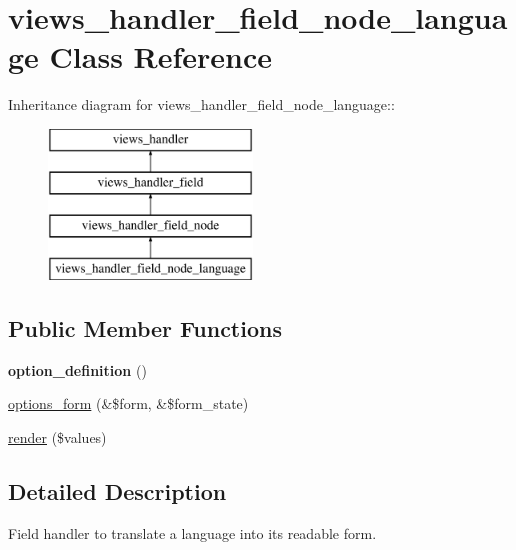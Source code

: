 \hypertarget{classviews__handler__field__node__language}{
\section{views\_\-handler\_\-field\_\-node\_\-language Class Reference}
\label{classviews__handler__field__node__language}
}
Inheritance diagram for views\_\-handler\_\-field\_\-node\_\-language::\begin{figure}[H]
\begin{center}
\leavevmode
\includegraphics[height=4cm]{classviews__handler__field__node__language}
\end{center}
\end{figure}
\subsection*{Public Member Functions}
\begin{DoxyCompactItemize}
\item 
\hypertarget{classviews__handler__field__node__language_abb10fafc6c58609a2a09db5f9dacb85e}{
{\bfseries option\_\-definition} ()}
\label{classviews__handler__field__node__language_abb10fafc6c58609a2a09db5f9dacb85e}

\item 
\hyperlink{classviews__handler__field__node__language_a5b37f58031ab251591bc4aad0651e8b4}{options\_\-form} (\&\$form, \&\$form\_\-state)
\item 
\hyperlink{classviews__handler__field__node__language_a04be837ecac8fcbbb38fb1a17e45263a}{render} (\$values)
\end{DoxyCompactItemize}


\subsection{Detailed Description}
Field handler to translate a language into its readable form. 

